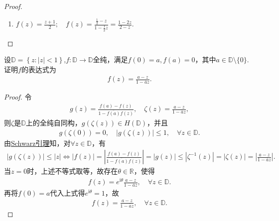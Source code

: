 \documentclass[../../main.tex]{subfiles}%
\begin{document}
\begin{proof}
\begin{enumerate}[(1)]
\item $f\left( z \right) =\frac{z+1}{2};\quad f\left( z \right) =\frac{\frac{1}{2}-z}{1-\frac{1}{2}z}=\frac{1-2z}{2-z}.$
\end{enumerate}
\end{proof}

\begin{example}
设$\mathbb{D} =\left\{ z:\left| z \right|<1 \right\}$,$f:\mathbb{D}\to\mathbb{D}$全纯，满足$f(0)=a,f(a)=0$，其中$a\in\mathbb{D}\setminus\{0\}$. 证明$f$的表达式为
\begin{align*}
f(z)=\frac{a-z}{1-\overline{a}z}.
\end{align*}
\end{example}
\begin{proof}
令
\begin{align*}
g\left( z \right) =\frac{f\left( a \right) -f\left( z \right)}{1-\overline{f\left( a \right) }f\left( z \right)},\quad \zeta \left( z \right) =\frac{a-z}{1-\overline{a}z},
\end{align*}
则$\zeta$是$\mathbb{D}$上的全纯自同构，$g\left( \zeta \left( z \right) \right) \in H\left( \mathbb{D} \right)$，并且
\begin{align*}
g\left( \zeta \left( 0 \right) \right) =0,\quad \left| g\left( \zeta \left( z \right) \right) \right|\leqslant 1,\quad \forall z\in \mathbb{D} .
\end{align*}
由\hyperref[theorem:Schwarz引理-定理4.5.3]{Schwarz引理}知，对$\forall z\in \mathbb{D}$，有
\begin{align*}
\left| g\left( \zeta \left( z \right) \right) \right|\leqslant \left| z \right|\Longleftrightarrow \left| f\left( z \right) \right|=\left| \frac{f\left( a \right) -f\left( z \right)}{1-\overline{f\left( a \right) }f\left( z \right)} \right|=\left| g\left( z \right) \right|\leqslant \left| \zeta ^{-1}\left( z \right) \right|=\left| \zeta \left( z \right) \right|=\left| \frac{a-z}{1-\overline{a}z} \right|.
\end{align*}
当$z=0$时，上述不等式取等，故存在$\theta \in \mathbb{R}$，使得
\begin{align*}
f\left( z \right) =e^{\mathrm{i}\theta}\frac{a-z}{1-\overline{a}z},\quad \forall z\in \mathbb{D} .
\end{align*}
再将$f\left( 0 \right) =a$代入上式得$e^{\mathrm{i}\theta}=1$，故
\begin{align*}
f\left( z \right) =\frac{a-z}{1-\overline{a}z},\quad \forall z\in \mathbb{D} .
\end{align*}
\end{proof}
\end{document}

